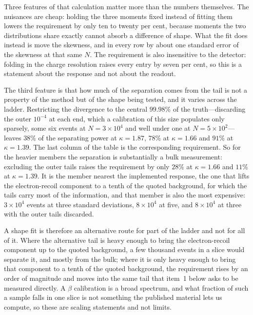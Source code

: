 \documentclass[11pt,a4paper]{article}
\begin{document}
\noindent Three features of that calculation matter more than the
numbers themselves. The nuisances are cheap: holding the three moments
fixed instead of fitting them lowers the requirement by only ten to
twenty per cent, because moments the two distributions share exactly
cannot absorb a difference of shape. What the fit does instead is move
the skewness, and in every row by about one standard error of the
skewness at that same \(N\). The requirement is also insensitive to the
detector: folding in the charge resolution raises every entry by seven
per cent, so this is a statement about the response and not about the
readout.

The third feature is that how much of the separation comes from the tail
is not a property of the method but of the shape being tested, and it
varies across the ladder. Restricting the divergence to the central
\(99.98\%\) of the truth---discarding the outer \(10^{-4}\) at each end,
which a calibration of this size populates only sparsely, some six
events at \(N=3\times10^{4}\) and well under one at
\(N=5\times10^{2}\)---leaves \(38\%\) of the separating power at
\(\kappa=1.87\), \(78\%\) at \(\kappa=1.66\) and \(91\%\) at
\(\kappa=1.39\). The last column of the table is the corresponding
requirement. So for the heavier members the separation is substantially
a bulk measurement: excluding the outer tails raises the requirement by
only \(28\%\) at \(\kappa=1.66\) and \(11\%\) at \(\kappa=1.39\). It is
the member nearest the implemented response, the one that lifts the
electron-recoil component to a tenth of the quoted background, for which
the tails carry most of the information, and that member is also the
most expensive: \(3\times10^{4}\) events at three standard deviations,
\(8\times10^{4}\) at five, and \(8\times10^{4}\) at three with the outer
tails discarded.

A shape fit is therefore an alternative route for part of the ladder and
not for all of it. Where the alternative tail is heavy enough to bring
the electron-recoil component up to the quoted background, a few
thousand events in a slice would separate it, and mostly from the bulk;
where it is only heavy enough to bring that component to a tenth of the
quoted background, the requirement rises by an order of magnitude and
moves into the same tail that item~1 below asks to be measured directly.
A \(\beta\) calibration is a broad spectrum, and what fraction of such a
sample falls in one slice is not something the published material lets
us compute, so these are scaling statements and not limits.
\end{document}

